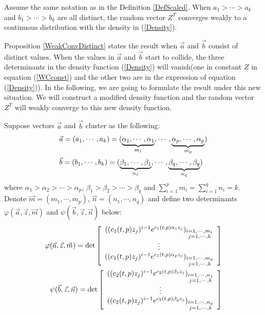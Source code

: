 \begin{proposition}{\label{WeakConvDistinct}}
Assume the same notation as in the Definition \ref{DefScaled}. When $a_{1}> \cdots > a_{k}$ and $b_{1}> \cdots > b_{k}$ are all distinct, the random vector $Z^{T}$ converges weakly to a continuous distribution with the density in (\ref{Density}).	
\end{proposition}

Proposition \ref{WeakConvDistinct} states the result when $\vec{a}$ and $\vec{b}$ consist of distinct values. When the values in $\vec{a}$ and $\vec{b}$ start to collide, the three determinants in the density function (\ref{Density}) will vanish(one in constant $Z$ in equation (\ref{WCconst}) and the other two are in the expression of equation (\ref{Density})). In the following, we are going to formulate the result under this new situation. We will construct a modified density function and the random vector $Z^{T}$ will weakly converge to this new density function.

Suppose vectors $\vec{a}$ and $\vec{b}$ cluster as the following:
\begin{equation}{\label{Block}}
\begin{split}
	&\vec{a}=(a_{1},\cdots,a_{k})=(\underbrace{\alpha_{1},\cdots,\alpha_{1}}_{m_{1}},\cdots,\underbrace{\alpha_{p},\cdots,\alpha_{p}}_{m_{p}})\\
	&\vec{b}=(b_{1},\cdots,b_{k})=(\underbrace{\beta_{1},\cdots,\beta_{1}}_{n_{1}},\cdots,\underbrace{\beta_{q},\cdots,\beta_{q}}_{n_{q}})
\end{split}
\end{equation}
where $\alpha_{1}>\alpha_{2}>\cdots>\alpha_{p}$, $\beta_{1}>\beta_{2}>\cdots>\beta_{q}$ and $\sum_{i=1}^{p}m_{i}=\sum_{i=1}^{q}n_{i}=k$. Denote $\vec{m}=(m_{1},\cdots,m_{p})$, $\vec{n}=(n_{1},\cdots,n_{q})$ and define two determinants $\varphi(\vec{a},\vec{z},\vec{m})$ and $\psi(\vec{b},\vec{z},\vec{n})$ below:
\begin{equation}{\label{TwoDet}}
\begin{split}
	\varphi(\vec{a},\vec{z},\vec{m})= \det
	\left[ \begin{array}{ccc}
		((c_{1}(t,p)z_{j})^{i-1}e^{c_{1}(t,p)\alpha_{1}z_{j}})_{\substack{i=1,\cdots,m_{1}\\j=1,\cdots,k}}\\
	\vdots\\
	((c_{1}(t,p)z_{j})^{i-1}e^{c_{1}(t,p)\alpha_{p}z_{j}})_{\substack{i=1,\cdots,m_{p} \\j=1,\cdots,k}}
	\end{array}
	\right]
\\
	\psi(\vec{b},\vec{z},\vec{n})= \det
	\left[ \begin{array}{ccc}
		((c_{2}(t,p)z_{j})^{i-1}e^{c_{2}(t,p)\beta_{1}z_{j}})_{\substack{i=1,\cdots,n_{1}\\j=1,\cdots,k}}\\
	\vdots\\
	((c_{2}(t,p)z_{j})^{i-1}e^{c_{2}(t,p)\beta_{q}z_{j}})_{\substack{i=1,\cdots, n_{q} \\j=1,\cdots,k}}
	\end{array}
	\right]
\end{split}
\end{equation}

